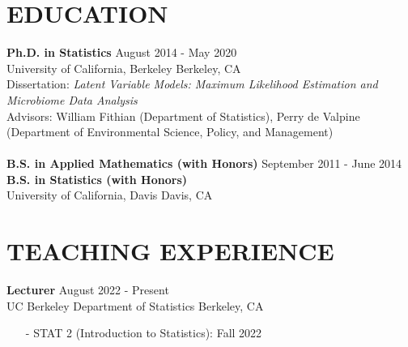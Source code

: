 \documentclass{res}
\begin{document}
\newcommand*\leftright[2]{%
\leavevmode
  {#1}%
  \hfill%
  #2}
\newcommand*\leftrighta[2]{%
  \leavevmode
  \rlap{#1}%
  \hspace{0.5\linewidth}%
  #2}


\address{Phone: (510) 676-8616 | Email: jcyhong@berkeley.edu | Website: http://jcyhong.github.io}
                                  
\begin{resume}  
 
\section{EDUCATION}
    \leftright{\textbf{Ph.D. in Statistics}}{August 2014 - May 2020} \\ 
    \leftright{University of California, Berkeley}{Berkeley, CA}\\
    Dissertation: \textit{Latent Variable Models: Maximum Likelihood Estimation and Microbiome Data Analysis}\\
    Advisors: William Fithian (Department of Statistics), Perry de Valpine (Department of Environmental Science, Policy, and Management)
    \\
    \\
    \leftright{\textbf{B.S. in Applied Mathematics (with Honors)}}{September 2011 - June 2014} \\
    \textbf{B.S. in Statistics (with Honors)} \\
    \leftright{University of California, Davis}{Davis, CA} \\

\section{TEACHING EXPERIENCE}

     \leftright{{\bf Lecturer}}{August 2022 - Present} \\ 
    \leftright{UC Berkeley Department of Statistics}{{Berkeley, CA}} 
        \begin{itemize}\setlength\itemsep{0em}
        \item[-] STAT 2 (Introduction to Statistics): Fall 2022
        \end{itemize}
        

\end{resume}
\end{document}
